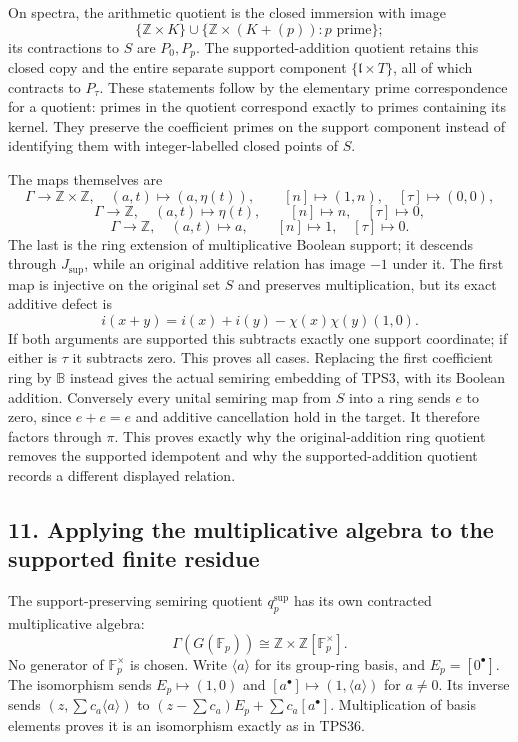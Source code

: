 \documentclass[
  10pt,
]{article}
\begin{document}
On spectra, the arithmetic quotient is the closed immersion with image
\[
\{\mathbb Z\times K\}\cup
\{\mathbb Z\times(K+(p)):p\text{ prime}\};
\] its contractions to \(S\) are \(P_0,P_p\). The supported-addition
quotient retains this closed copy and the entire separate support
component \(\{\mathfrak l\times T\}\), all of which contracts to
\(P_\tau\). These statements follow by the elementary prime
correspondence for a quotient: primes in the quotient correspond exactly
to primes containing its kernel. They preserve the coefficient primes on
the support component instead of identifying them with integer-labelled
closed points of \(S\).

The maps themselves are \[
\Gamma\to\mathbb Z\times\mathbb Z,\quad (a,t)\mapsto(a,\eta(t)),\qquad
[n]\mapsto(1,n),\quad[\tau]\mapsto(0,0),
\] \[
\Gamma\to\mathbb Z,\quad(a,t)\mapsto\eta(t),\qquad
[n]\mapsto n,\quad[\tau]\mapsto0,
\] \[
\Gamma\to\mathbb Z,\quad(a,t)\mapsto a,\qquad
[n]\mapsto1,\quad[\tau]\mapsto0.
\tag{TPS46}
\] The last is the ring extension of multiplicative Boolean support; it
descends through \(J_{\mathrm{sup}}\), while an original additive
relation has image \(-1\) under it. The first map is injective on the
original set \(S\) and preserves multiplication, but its exact additive
defect is \[
i(x+y)=i(x)+i(y)-\chi(x)\chi(y)(1,0).
\tag{TPS47}
\] If both arguments are supported this subtracts exactly one support
coordinate; if either is \(\tau\) it subtracts zero. This proves all
cases. Replacing the first coefficient ring by \(\mathbb B\) instead
gives the actual semiring embedding of TPS3, with its Boolean addition.
Conversely every unital semiring map from \(S\) into a ring sends \(e\)
to zero, since \(e+e=e\) and additive cancellation hold in the target.
It therefore factors through \(\pi\). This proves exactly why the
original-addition ring quotient removes the supported idempotent and why
the supported-addition quotient records a different displayed relation.

\subsection{11. Applying the multiplicative algebra to the supported
finite
residue}\label{applying-the-multiplicative-algebra-to-the-supported-finite-residue}

The support-preserving semiring quotient \(q_p^{\mathrm{sup}}\) has its
own contracted multiplicative algebra: \[
\boxed{\Gamma(G(\mathbb F_p))\cong
\mathbb Z\times\mathbb Z[\mathbb F_p^\times].}
\tag{TPS48}
\] No generator of \(\mathbb F_p^\times\) is chosen. Write
\(\langle a\rangle\) for its group-ring basis, and \(E_p=[0^\bullet]\).
The isomorphism sends \(E_p\mapsto(1,0)\) and
\([a^\bullet]\mapsto(1,\langle a\rangle)\) for \(a\ne0\). Its inverse
sends \((z,\sum c_a\langle a\rangle)\) to
\((z-\sum c_a)E_p+\sum c_a[a^\bullet]\). Multiplication of basis
elements proves it is an isomorphism exactly as in TPS36.
\end{document}
